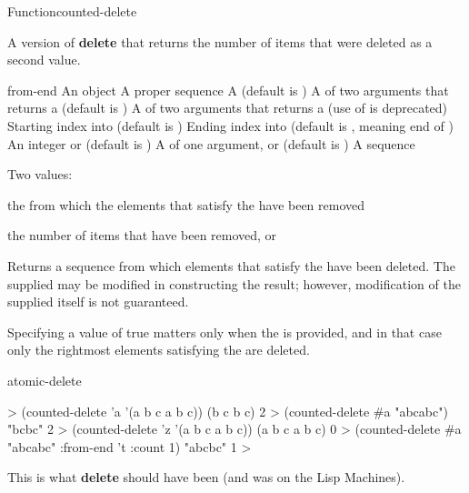 \documentclass[10pt,twoside,english,pdftex]{article}
\begin{document}
\begin{functiondoc}{Function}{counted-delete}{
     
    \mbox{\returns{} }}

\fnsyntax

\fnpurpose A version of \textbf{delete} that returns the number of items
that were deleted as a second value. 

\fnpackage {}

\fnmodule {}

\fnargs
\begin{args}{from-end}
\arg[item] An object
\arg[sequence] A proper sequence
 A  (default is \nil)
\arg[test] A  of two arguments that returns a
 (default is ) 
 A  of two arguments that returns a
 (use of  is deprecated)
\arg[start] Starting index into  (default is )
\arg[end] Ending index into  (default is \nil, meaning
end of )
\arg[count] An integer or \nil{} (default is \nil)
\arg[key] A  of one argument, or \nil{} (default is \nil)
 A sequence
\end{args}

\fnreturns Two values: 
\begin{tightitemize}
\item the  from which the elements that satisfy the
   have been removed 
\item the number of items that have been removed, or \nil
\end{tightitemize}

\fndescription Returns a sequence from which elements that satisfy the
 have been deleted.  The supplied  may be modified
in constructing the result; however, modification of the supplied
 itself is not guaranteed.

Specifying a  value of true matters only when
the  is provided, and in that case only the rightmost
 elements satisfying the  are deleted.

\begin{alsos}{atomic-delete}
\end{alsos}

\fnexamples
\begin{example}
%
\W\supp
  > (counted-delete 'a '(a b c a b c))
  (b c b c)
  2
  > (counted-delete #\bkslash{}a "abcabc")
  "bcbc"
  2\goodpagebreak
  > (counted-delete 'z '(a b c a b c))
  (a b c a b c)
  0
  > (counted-delete #\bkslash{}a "abcabc" :from-end 't :count 1)
  "abcbc"
  1
  >
\end{example}

\fnnote This is what \textbf{delete} should have been (and was on the
Lisp Machines). 

\end{functiondoc}
\end{document}
